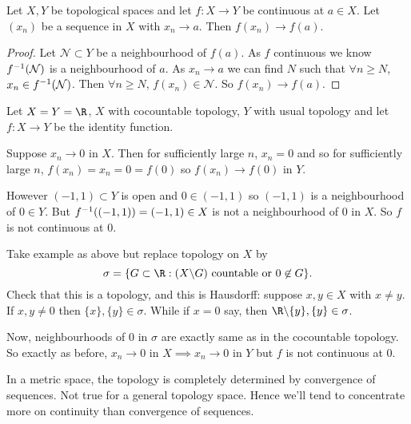 \begin{proposition}          %
Let $X,Y$ be topological spaces and let $f:X\rightarrow Y$ be continuous at $a\in X$. Let $(x_n)$ be a sequence in $X$ with $x_n\rightarrow a$. Then $f(x_n)\rightarrow f(a)$.
\end{proposition}
\begin{proof}
Let $\mathcal{N}\subset Y$ be a neighbourhood of $f(a)$. As $f$ continuous we know $f^{-1} (\mathcal{N})$ is a neighbourhood of $a$. As $x_n\rightarrow a$ we can find $N$ such that $\forall n\ge N$, $x_n\in f^{-1}(\mathcal{N})$. Then $\forall n\ge N$, $f(x_n)\in \mathcal{N}$. So $f(x_n)\rightarrow f(a)$.
\end{proof}

\begin{example}
Let $X=Y=\R$, $X$ with cocountable topology, $Y$ with usual topology and let $f:X\rightarrow Y$ be the identity function.

Suppose $x_n\rightarrow 0$ in $X$. Then for sufficiently large $n$, $x_n=0$ and so for sufficiently large $n$, $f(x_n) = x_n = 0 = f(0)$ so $f(x_n)\rightarrow f(0)$ in $Y$.

However $(-1,1)\subset Y$ is open and $0\in (-1,1)$ so $(-1,1)$ is a neighbourhood of $0\in Y$. But $f^{-1}((-1,1)) = (-1,1)\in X$ is not a neighbourhood of $0$ in $X$. So $f$ is not continuous at $0$.
\end{example}
\begin{example}
Take example as above but replace topology on $X$ by \[\sigma = \{G\subset \R : (X\backslash G) \textup{ countable or } 0\not\in G \}. \]
Check that this is a topology, and this is Hausdorff: suppose $x,y\in X$ with $x\neq y$. If $x,y\neq 0$ then $\{x\}, \{y\}\in \sigma$. While if $x=0$ say, then $\R\backslash \{y\}, \{y\}\in \sigma$.

Now, neighbourhoods of $0$ in $\sigma$ are exactly same as in the cocountable topology. So exactly as before, $x_n\rightarrow 0$ in $X\implies x_n\rightarrow 0$ in $Y$ but $f$ is not continuous at $0$.
\end{example}
\begin{remark}
In a metric space, the topology is completely determined by convergence of sequences. Not true for a general topology space. Hence we'll tend to concentrate more on continuity than convergence of sequences.
\end{remark}

